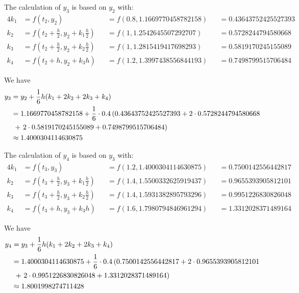 \documentclass[a4paper]{article}
\begin{document}
The calculation of \(y_3\) is based on \(y_2\) with:
\begin{alignat*}{4}
  k_1 & = f(t_2, y_2)                                            &  & = f(0.8, 1.1669770458782158) &  & = 0.43643752425527393 \\
  k_2 & = f \left(t_2 + \frac{h}{2}, y_2 + k_1\frac{h}{2}\right) &  & = f(1, 1.2542645507292707)   &  & = 0.5728244794580668  \\
  k_3 & = f \left(t_2 + \frac{h}{2}, y_2 + k_2\frac{h}{2}\right) &  & = f(1, 1.2815419417698293)   &  & = 0.5819170245155089  \\
  k_4 & = f(t_2 + h, y_2 + k_3h)                                 &  & = f(1.2, 1.3997438556844193) &  & = 0.7498799515706484
\end{alignat*}

We have
\begin{align*}
  y_3 & = y_2 + \frac{1}{6}h(k_1 + 2k_2 + 2k_3 + k_4)                                                             \\
      & = 1.1669770458782158 + \frac{1}{6} \cdot 0.4\left(0.43643752425527393 + 2 \cdot 0.5728244794580668\right. \\
      & \;\left.+\ 2 \cdot 0.5819170245155089 + 0.7498799515706484\vphantom{1}\right)                             \\
      & \approx 1.4000304114630875
\end{align*}

The calculation of \(y_4\) is based on \(y_3\) with:
\begin{alignat*}{4}
  k_1 & = f(t_3, y_3)                                            &  & = f(1.2, 1.4000304114630875) &  & = 0.7500142556442817 \\
  k_2 & = f \left(t_3 + \frac{h}{2}, y_3 + k_1\frac{h}{2}\right) &  & = f(1.4, 1.5500332625919437) &  & = 0.9655393905812101 \\
  k_3 & = f \left(t_3 + \frac{h}{2}, y_3 + k_2\frac{h}{2}\right) &  & = f(1.4, 1.5931382895793296) &  & = 0.9951226830826048 \\
  k_4 & = f(t_3 + h, y_3 + k_3h)                                 &  & = f(1.6, 1.7980794846961294) &  & = 1.3312028371489164
\end{alignat*}

We have
\begin{align*}
  y_4 & = y_3 + \frac{1}{6}h(k_1 + 2k_2 + 2k_3 + k_4)                                                            \\
      & = 1.4000304114630875 + \frac{1}{6} \cdot 0.4\left(0.7500142556442817 + 2 \cdot 0.9655393905812101\right. \\
      & \;\left.+\ 2 \cdot 0.9951226830826048 + 1.3312028371489164\vphantom{1}\right)                            \\
      & \approx 1.8001998274711428
\end{align*}
\end{document}
